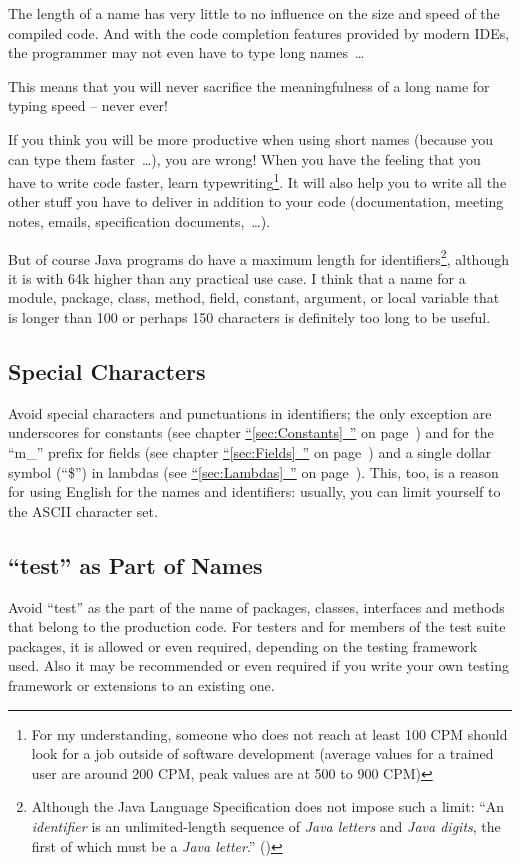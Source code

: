 \documentclass[11pt,a4paper, titlepage, parskip=half, headsepline, footsepline, cleardoublepage=current, headheight=1cm]{scrbook}
\newcommand*{\tqfullvref}[1]{\hyperref[{#1}]{“\ref*{#1}~\nameref*{#1}”} on page~\pageref{#1}}
\begin{document}
The length of a name has very little to no influence on the size and speed of the compiled code. And with the code completion features provided by modern IDEs, the programmer may not even have to type long names~…

This means that you will never sacrifice the meaningfulness of a long name for typing speed – never ever!

If you think you will be more productive when using short names (because you can type them faster~…), you are wrong! When you have the feeling that you have to write code faster, learn typewriting\footnote{For my understanding, someone who does not reach at least 100 CPM should look for a job outside of software development (average values for a trained user are around 200 CPM, peak values are at 500 to 900 CPM)}. It will also help you to write all the other stuff you have to deliver in addition to your code (documentation, meeting notes, emails, specification documents,~…).

But of course Java programs do have a maximum length for identifiers\footnote{Although the Java Language Specification does not impose such a limit: “An \textit{identifier} is an unlimited-length sequence of \textit{Java letters} and \textit{Java digits}, the first of which must be a \textit{Java letter}.” (\autocite{ORACLE_DOC_LANGUAGE_SPECIFICATION:Identifiers})}, although it is with 64k higher than any practical use case. I think that a name for a module, package, class, method, field, constant, argument, or local variable that is longer than 100 or perhaps 150 characters is definitely too long to be useful.

\subsection{Special Characters}
Avoid special characters and punctuations in identifiers; the only exception are underscores for constants (see chapter \tqfullvref{sec:Constants}) and for the “m\_” prefix for fields (see chapter \tqfullvref{sec:Fields}) and a single dollar symbol (“\$”) in lambdas (see \tqfullvref{sec:Lambdas}). This, too, is a reason for using English for the names and identifiers: usually, you can limit yourself to the ASCII character set.

\subsection{“test” as Part of Names}
Avoid “test” as the part of the name of packages, classes, interfaces and methods that belong to the production code. For testers and for members of the test suite packages, it is allowed or even required, depending on the testing framework used. Also it may be recommended or even required if you write your own testing framework or extensions to an existing one.
\end{document}
